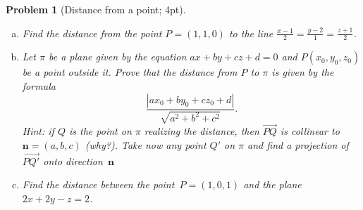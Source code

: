 \documentclass[12pt,a4]{article}
\newtheorem{problem}{Problem}
\begin{document}
\begin{problem}[Distance from a point; 4pt]\rm 
	\begin{enumerate}[(a)]		
		\item Find the distance from the point $P=(1,1,0)$ to the line $\frac{x-1}{2}=\frac{y-2}{1} = \frac{z+1}{2}$. 
		\item Let $\pi$ be a plane given by the equation $ax + by + cz +d = 0$ and $P(x_0,y_0,z_0)$ be a point outside it. Prove that the distance from $P$ to $\pi$ is given by the formula
		\[
			\frac{|ax_0 + by_0 + cz_0 + d|}{\sqrt{a^2 + b^2 + c^2}}.
		\] 
		\small{\textsf{Hint: if $Q$ is the point on $\pi$ realizing the distance, then $\overrightarrow{PQ}$ is collinear to $\mathbf{n}=(a,b,c)$ (why?). Take now any point $Q'$ on $\pi$ and find a projection of $\overrightarrow{PQ'}$ onto direction~$\mathbf{n}$}}
		\item Find the distance between the point~$P=(1,0,1)$ and the plane~$2x+2y-z=2$.
	\end{enumerate}
\end{problem}
\end{document}
